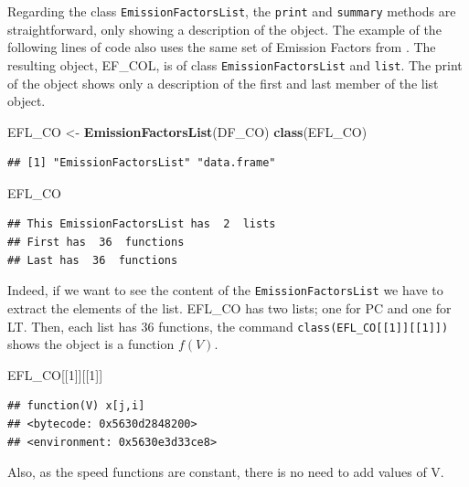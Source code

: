 \documentclass[12pt,graybox,envcountchap,sectrefs]{krantz}
\makeatletter
\newenvironment{Shaded}{\begin{snugshade}}{\end{snugshade}}
\newcommand{\KeywordTok}[1]{\textcolor[rgb]{0.13,0.29,0.53}{\textbf{#1}}}
\newcommand{\DecValTok}[1]{\textcolor[rgb]{0.00,0.00,0.81}{#1}}
\newcommand{\StringTok}[1]{\textcolor[rgb]{0.31,0.60,0.02}{#1}}
\newcommand{\NormalTok}[1]{#1}
\newenvironment{kframe}{%
\medskip{}
\setlength{\fboxsep}{.8em}
 \def\at@end@of@kframe{}%
 \ifinner\ifhmode%
  \def\at@end@of@kframe{\end{minipage}}%
  \begin{minipage}{\columnwidth}%
 \fi\fi%
 \def\FrameCommand##1{\hskip\@totalleftmargin \hskip-\fboxsep
 \colorbox{shadecolor}{##1}\hskip-\fboxsep
     \hskip-\linewidth \hskip-\@totalleftmargin \hskip\columnwidth}%
 \MakeFramed {\advance\hsize-\width
   \@totalleftmargin\z@ \linewidth\hsize
   \@setminipage}}%
 {\par\unskip\endMakeFramed%
 \at@end@of@kframe}
\renewenvironment{Shaded}{\begin{kframe}}{\end{kframe}}
\theoremstyle{definition}
\theoremstyle{definition}
\theoremstyle{definition}
\theoremstyle{remark}
\makeatother
\begin{document}
Regarding the class \texttt{EmissionFactorsList}, the \texttt{print} and
\texttt{summary} methods are straightforward, only showing a description
of the object. The example of the following lines of code also uses the
same set of Emission Factors from \citet{CETESB2015}. The resulting
object, EF\_COL, is of class \texttt{EmissionFactorsList} and
\texttt{list}. The print of the object shows only a description of the
first and last member of the list object.

\begin{Shaded}
\begin{Highlighting}[]
\NormalTok{EFL_CO <-}\StringTok{ }\KeywordTok{EmissionFactorsList}\NormalTok{(DF_CO)}
\KeywordTok{class}\NormalTok{(EFL_CO)}
\end{Highlighting}
\end{Shaded}

\begin{verbatim}
## [1] "EmissionFactorsList" "data.frame"
\end{verbatim}

\begin{Shaded}
\begin{Highlighting}[]
\NormalTok{EFL_CO}
\end{Highlighting}
\end{Shaded}

\begin{verbatim}
## This EmissionFactorsList has  2  lists
## First has  36  functions
## Last has  36  functions
\end{verbatim}

Indeed, if we want to see the content of the
\texttt{EmissionFactorsList} we have to extract the elements of the
list. EFL\_CO has two lists; one for PC and one for LT. Then, each list
has 36 functions, the command
\texttt{class(EFL\_CO{[}{[}1{]}{]}{[}{[}1{]}{]})} shows the object is a
function \(f(V)\).

\begin{Shaded}
\begin{Highlighting}[]
\NormalTok{EFL_CO[[}\DecValTok{1}\NormalTok{]][[}\DecValTok{1}\NormalTok{]]}
\end{Highlighting}
\end{Shaded}

\begin{verbatim}
## function(V) x[j,i]
## <bytecode: 0x5630d2848200>
## <environment: 0x5630e3d33ce8>
\end{verbatim}

Also, as the speed functions are constant, there is no need to add
values of V.
\end{document}
